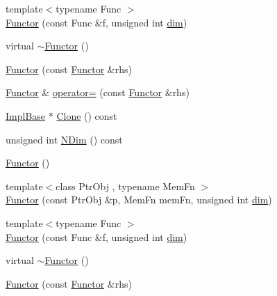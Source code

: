 \begin{DoxyCompactItemize}
\item 
{\footnotesize template$<$typename Func $>$ }\\\mbox{\hyperlink{classROOT_1_1Math_1_1Functor_a82af0df828055f18310af5d49dcc3aa2}{Functor}} (const Func \&f, unsigned int \mbox{\hyperlink{adat__devel_2lib_2hadron_2irrep__util_8cc_a70b5e28b5bc3d1b63a7435c5fe50b837}{dim}})
\item 
virtual \mbox{\hyperlink{classROOT_1_1Math_1_1Functor_a349935f827a453deb17fdad728849028}{$\sim$\+Functor}} ()
\item 
\mbox{\hyperlink{classROOT_1_1Math_1_1Functor_a001bfe27e95032f05685167e77e0efbd}{Functor}} (const \mbox{\hyperlink{classROOT_1_1Math_1_1Functor}{Functor}} \&rhs)
\item 
\mbox{\hyperlink{classROOT_1_1Math_1_1Functor}{Functor}} \& \mbox{\hyperlink{classROOT_1_1Math_1_1Functor_a24bd9cdf7e31e443bff64c5fb4378c99}{operator=}} (const \mbox{\hyperlink{classROOT_1_1Math_1_1Functor}{Functor}} \&rhs)
\item 
\mbox{\hyperlink{classROOT_1_1Math_1_1Functor_acc5dacb213f26296122e95138f5153b3}{Impl\+Base}} $\ast$ \mbox{\hyperlink{classROOT_1_1Math_1_1Functor_a989f9b6dd160ebe03911cdee00dacaad}{Clone}} () const
\item 
unsigned int \mbox{\hyperlink{classROOT_1_1Math_1_1Functor_a2544e2ed3c6a0420084c7b08eb3c3130}{N\+Dim}} () const
\item 
\mbox{\hyperlink{classROOT_1_1Math_1_1Functor_a2330648eca94b53b3ba613e49d03927f}{Functor}} ()
\item 
{\footnotesize template$<$class Ptr\+Obj , typename Mem\+Fn $>$ }\\\mbox{\hyperlink{classROOT_1_1Math_1_1Functor_ad6dbce8351bd8c74e6754215a3ccac41}{Functor}} (const Ptr\+Obj \&p, Mem\+Fn mem\+Fn, unsigned int \mbox{\hyperlink{adat__devel_2lib_2hadron_2irrep__util_8cc_a70b5e28b5bc3d1b63a7435c5fe50b837}{dim}})
\item 
{\footnotesize template$<$typename Func $>$ }\\\mbox{\hyperlink{classROOT_1_1Math_1_1Functor_a82af0df828055f18310af5d49dcc3aa2}{Functor}} (const Func \&f, unsigned int \mbox{\hyperlink{adat__devel_2lib_2hadron_2irrep__util_8cc_a70b5e28b5bc3d1b63a7435c5fe50b837}{dim}})
\item 
virtual \mbox{\hyperlink{classROOT_1_1Math_1_1Functor_a349935f827a453deb17fdad728849028}{$\sim$\+Functor}} ()
\item 
\mbox{\hyperlink{classROOT_1_1Math_1_1Functor_a001bfe27e95032f05685167e77e0efbd}{Functor}} (const \mbox{\hyperlink{classROOT_1_1Math_1_1Functor}{Functor}} \&rhs)

\end{DoxyCompactItemize}
